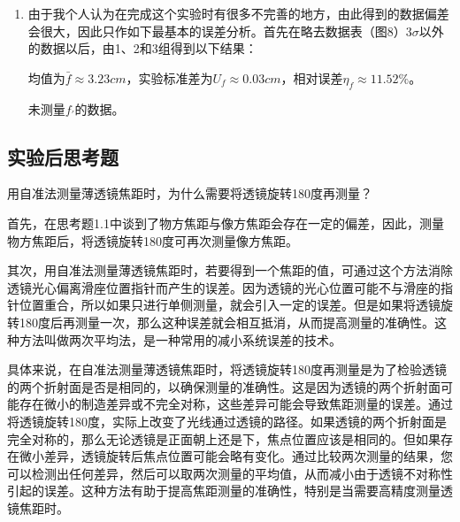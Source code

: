 \documentclass[dvipsnames, svgnames,a4paper,11pt]{article}
\begin{document}
\begin{enumerate}
		\begin{equation*}
			f^{'}=\bar{f^{'}}\pm U_{f^{'}}=\bar{f^{'}}\pm\sqrt{u_{A}^{2}+u_{B}^{2}}\approx( 14.92 \pm  1.44 )cm
		\end{equation*} 
		其中展伸不确定度$U_{f^{'}}={f^{'}}\times{u_{f^{'}}}\approx 1.44 $ 是由合成标准不确定度$u_{f^{'}}\approx 0.58 $ 和$k\approx4.30$确定的，k是依据置信概率$P=95\%$和自由度$\nu\approx2.74$查t分布表得到的。
		
		以上数据利用到了数据表（图5）中数据。
		
		\item 由于我个人认为在完成这个实验时有很多不完善的地方，由此得到的数据偏差会很大，因此只作如下最基本的误差分析。首先在略去数据表（图8）3$\sigma$以外的数据以后，由1、2和3组得到以下结果：
		
		均值为$\bar{f}\approx3.23cm$，实验标准差为$U_{f}\approx0.03cm$，相对误差$\eta_{f}\approx11.52\%$。
		
		未测量$f_{\prime}$的数据。
	\end{enumerate}
		
	\subsection{实验后思考题}
	\begin{question}
		用自准法测量薄透镜焦距时，为什么需要将透镜旋转180度再测量？
	\end{question}
	首先，在思考题1.1中谈到了物方焦距与像方焦距会存在一定的偏差，因此，测量物方焦距后，将透镜旋转180度可再次测量像方焦距。
	
	其次，用自准法测量薄透镜焦距时，若要得到一个焦距的值，可通过这个方法消除透镜光心偏离滑座位置指针而产生的误差。因为透镜的光心位置可能不与滑座的指针位置重合，所以如果只进行单侧测量，就会引入一定的误差。但是如果将透镜旋转180度后再测量一次，那么这种误差就会相互抵消，从而提高测量的准确性。这种方法叫做两次平均法，是一种常用的减小系统误差的技术。
	
	具体来说，在自准法测量薄透镜焦距时，将透镜旋转180度再测量是为了检验透镜的两个折射面是否是相同的，以确保测量的准确性。这是因为透镜的两个折射面可能存在微小的制造差异或不完全对称，这些差异可能会导致焦距测量的误差。通过将透镜旋转180度，实际上改变了光线通过透镜的路径。如果透镜的两个折射面是完全对称的，那么无论透镜是正面朝上还是下，焦点位置应该是相同的。但如果存在微小差异，透镜旋转后焦点位置可能会略有变化。通过比较两次测量的结果，您可以检测出任何差异，然后可以取两次测量的平均值，从而减小由于透镜不对称性引起的误差。这种方法有助于提高焦距测量的准确性，特别是当需要高精度测量透镜焦距时。
	
\end{document}

